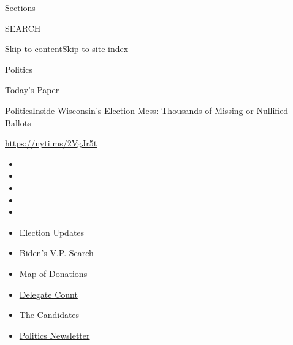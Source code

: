 Sections

SEARCH

\protect\hyperlink{site-content}{Skip to
content}\protect\hyperlink{site-index}{Skip to site index}

\href{https://www.nytimes.com/section/politics}{Politics}

\href{https://myaccount.nytimes.com/auth/login?response_type=cookie\&client_id=vi}{}

\href{https://www.nytimes.com/section/todayspaper}{Today's Paper}

\href{/section/politics}{Politics}\textbar{}Inside Wisconsin's Election
Mess: Thousands of Missing or Nullified Ballots

\url{https://nyti.ms/2VgJr5t}

\begin{itemize}
\item
\item
\item
\item
\item
\end{itemize}

\begin{itemize}
\item
  \href{https://www.nytimes.com/2020/07/31/us/elections/biden-vs-trump.html?action=click\&pgtype=Article\&state=default\&region=TOP_BANNER\&context=storylines_menu}{Election
  Updates}
\item
  \href{https://www.nytimes.com/article/biden-vice-president-2020.html?action=click\&pgtype=Article\&state=default\&region=TOP_BANNER\&context=storylines_menu}{Biden's
  V.P. Search}
\item
  \href{https://www.nytimes.com/interactive/2020/07/24/us/politics/trump-biden-campaign-donors.html?action=click\&pgtype=Article\&state=default\&region=TOP_BANNER\&context=storylines_menu}{Map
  of Donations}
\item
  \href{https://www.nytimes.com/interactive/2020/us/elections/delegate-count-primary-results.html?action=click\&pgtype=Article\&state=default\&region=TOP_BANNER\&context=storylines_menu}{Delegate
  Count}
\item
  \href{https://www.nytimes.com/interactive/2019/us/politics/2020-presidential-candidates.html?action=click\&pgtype=Article\&state=default\&region=TOP_BANNER\&context=storylines_menu}{The
  Candidates}
\item
  \href{https://www.nytimes.com/newsletters/politics?action=click\&pgtype=Article\&state=default\&region=TOP_BANNER\&context=storylines_menu}{Politics
  Newsletter}
\end{itemize}

